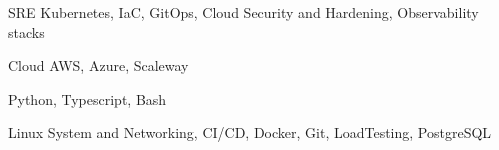 

\begin{cvskills}

  \cvskill
    {SRE} %
    {Kubernetes, IaC, GitOps, Cloud Security and Hardening, Observability stacks} %

  \cvskill
    {Cloud}
    {AWS, Azure, Scaleway}

  \cvskill
    {} %
    {Python, Typescript, Bash } %

  \cvskill
    {} %
    {Linux System and Networking, CI/CD, Docker, Git, LoadTesting, PostgreSQL } %

  \cvskill
    {} %
    {} %

\end{cvskills}
